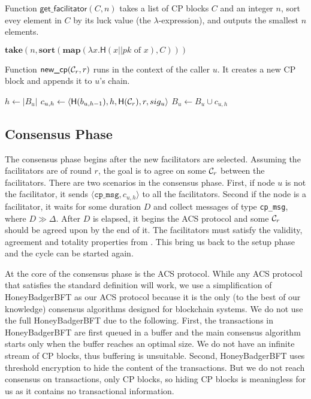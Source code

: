 \begin{algorithm}
\caption{Function $\textsf{get\_facilitator}(C, n)$ takes a list of CP blocks $C$ and an integer $n$,
sort evey element in $C$ by its luck value (the $\lambda$-expression), and outputs the smallest $n$ elements.}
\label{alg:facilitator}
\begin{algorithmic}
\State $\textbf{take} (n, \textbf{sort} (\textbf{map}(\lambda x.\textsf{H}(x || pk \text{ of } x), C)))$
\end{algorithmic}
\end{algorithm}

\begin{algorithm}
\caption{Function $\textsf{new\_cp}(\mathcal{C}_r, r)$ runs in the context of the caller $u$.
It creates a new CP block and appends it to $u$'s chain.}
\label{alg:new-cp}
\begin{algorithmic}
\State $h \gets |B_u|$
\State $c_{u, h} \gets \langle \textsf{H}(b_{u, h-1}), h, \textsf{H}(\mathcal{C}_r), r, sig_u \rangle$
\State $B_u \gets B_u \cup c_{u, h}$
\end{algorithmic}
\end{algorithm}

\subsection{Consensus Phase}
The consensus phase begins after the new facilitators are selected.
Assuming the facilitators are of round $r$,
the goal is to agree on some $\mathcal{C}_r$ between the facilitators.
There are two scenarios in the consensus phase.
First, if node $u$ is not the facilitator, it sends $\langle \texttt{cp\_msg}, c_{u, h} \rangle$ to all the facilitators.
Second if the node is a facilitator, it waits for some duration $D$ and collect messages of type \texttt{cp\_msg}, where $D \gg \Delta$.
After $D$ is elapsed, it begins the ACS protocol and some $\mathcal{C}_r$ should be agreed upon by the end of it.
The facilitators must satisfy the validity, agreement and totality properties from .
This bring us back to the setup phase and the cycle can be started again.

At the core of the consensus phase is the ACS protocol.
While any ACS protocol that satisfies the standard definition will work,
we use a simplification of HoneyBadgerBFT as our ACS protocol
because it is the only (to the best of our knowledge) consensus algorithms designed for blockchain systems.
We do not use the full HoneyBadgerBFT due to the following.
First, the transactions in HoneyBadgerBFT are first queued in a buffer and the main consensus algorithm starts only when the buffer reaches an optimal size.
We do not have an infinite stream of CP blocks, thus buffering is unsuitable.
Second, HoneyBadgerBFT uses threshold encryption to hide the content of the transactions.
But we do not reach consensus on transactions, only CP blocks, so hiding CP blocks is meaningless for us as it contains no transactional information.

